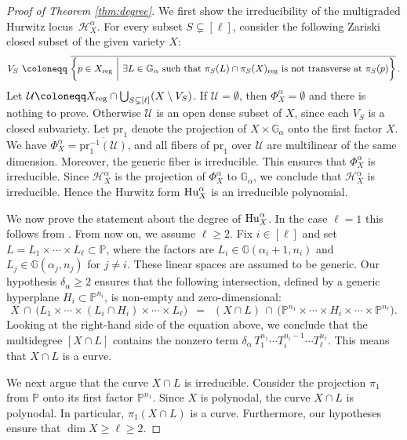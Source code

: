 \documentclass[12pt]{article}
\theoremstyle{definition}
\newcommand{\bG}{\mathbb G}
\newcommand{\bP}{\mathbb P}
\newcommand{\cH}{\mathcal H}
\begin{document}
\begin{proof}[Proof of Theorem \ref{thm:degree}]
We first show the irreducibility of 
the multigraded Hurwitz locus~$\cH_X^\alpha$. For every subset $S\subsetneq[\ell]$, 
consider the following Zariski closed subset of the given variety $X$:
\[
    V_S\,\, \coloneqq \,\,\overline{\left\{p\in X_{\rm reg}\ \bigg|\ 
    \text{$\exists L\in\bG_\alpha$ such that $\pi_S(L)\cap\pi_S(X)_{\rm reg}$ is not transverse at $\pi_S(p)$}\right\}}\,.
\]
Let $\mathcal{U}\coloneqq X_{\rm reg}\cap\bigcup_{S\subsetneq[\ell]}(X\setminus V_S)$. 
If $\mathcal{U}=\emptyset$, then $\Phi^\alpha_X=\emptyset$ and there is nothing to prove. 
Otherwise $\mathcal{U}$ is an open dense subset of $X$, since each 
$V_S$ is a closed subvariety. Let $\mathrm{pr}_1$ denote the projection of $X\times\bG_\alpha$ 
onto the first factor $X$.  We have
$\Phi^\alpha_X=\overline{\mathrm{pr}_1^{-1}(\mathcal{U})}$, and all fibers of $\mathrm{pr}_1$ over $\mathcal{U}$ are multilinear of the same dimension. Moreover, the generic fiber is irreducible.
This ensures that $\Phi^\alpha_X$ is irreducible. Since $\cH_X^\alpha$ is the projection of $\Phi^\alpha_X$ to $\bG_\alpha$, we conclude that $\cH_X^\alpha$ is irreducible. Hence 
the Hurwitz form ${\rm Hu}_X^\alpha$ is an irreducible polynomial.

We now prove the statement about the degree of ${\rm Hu}_X^\alpha$.
In the case $\ell=1$ this follows from \cite[Theorem 1.1]{hurwitz}. 
From now on, we assume $\ell\ge 2$.
Fix $i \in [\ell]$ and set $L = L_1 \times \cdots \times L_\ell \subset \bP$,
where the factors are
$L_i \in \bG(\alpha_i+1,n_i)$ and
$L_j \in \bG(\alpha_j,n_j)$ for $j \not= i$. These
linear spaces are assumed to be generic. 
Our hypothesis $\delta_\alpha\ge 2$ ensures
that the following intersection, defined by
 a generic hyperplane $H_i\subset\bP^{n_i}$, is non-empty and
zero-dimensional:
\[
    X \,\cap\, \bigl(L_1\times\cdots\times (L_i\cap H_i)\times \cdots \times L_\ell\bigr)
     \,\,\, =\,\,\,  (X \cap L) \,\cap\, \bigl(\bP^{n_1}\times \cdots\times H_i\times\cdots\times \bP^{n_\ell}\bigr).
\]
 Looking at the right-hand side of the equation above, we conclude that the multidegree $[X\cap L]$ contains the nonzero term $\delta_\alpha\,T_1^{n_1}\cdots T_i^{n_i-1}\cdots T_\ell^{n_\ell}$.
 This means that $X \cap L$ is a curve.

We next argue that the curve $X \cap L$ is irreducible.
Consider the projection $\pi_1$ from $\bP$ onto its first factor $\bP^{n_1}$. Since $X$ is polynodal, 
the curve $X\cap L$ is polynodal. In particular, $\pi_1(X\cap L)$ is a curve.
Furthermore, our hypotheses ensure that $\dim X\ge\ell\ge 2$.


\end{proof}
\end{document}
